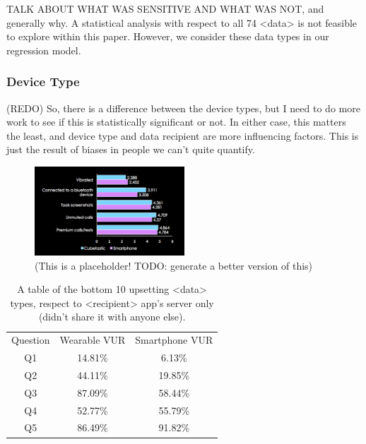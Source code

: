 \documentclass{acm_proc_article-sp}
\begin{document}
TALK ABOUT WHAT WAS SENSITIVE AND WHAT WAS NOT, and generally why. A statistical analysis with respect to all 74 <data> is not feasible to explore within this paper. However, we consider these data types in our regression model.  

\subsubsection{Device Type}

(REDO) So, there is a difference between the device types, but I need to do more work to see if this is statistically significant or not. In either case, this matters the least, and device type and data recipient are more influencing factors. This is just the result of biases in people we can't quite quantify.  

\begin{figure}
	\centering
	\includegraphics[width=0.5\textwidth]{device-type.png}
	\caption{(This is a placeholder! TODO: generate a better version of this)}
\end{figure}

\begin{table}%
\begin{center}
\begin{tabular}{| c | c | c |}
 Question &  Wearable VUR & Smartphone VUR \\
Q1 & 14.81\%  &  6.13\%\\
Q2 & 44.11\%  &  19.85\%\\
Q3 & 87.09\%  &  58.44\%\\
Q4 & 52.77\%  & 55.79\%\\
Q5 & 86.49\%  &  91.82\%\\ 
\end{tabular}
\caption{A table of the bottom 10 upsetting <data> types, respect to <recipient> app's server only (didn't share it with anyone else).}
\label{deviceVUR}
\end{center}
\end{table}
\end{document}
